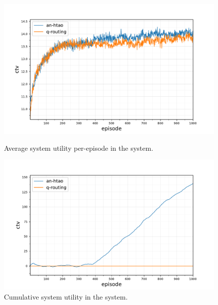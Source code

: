 \begin{figure}[ht]
	\begin{minipage}{.49\textwidth}
		\centering
		\includegraphics[width=1.0\linewidth,trim={25pt 0pt 50pt 0pt},clip]{520balanced_statistics-optimal-ctv}
		\captionsetup{labelfont=bf,singlelinecheck=on}
		\caption{Average system utility per-episode in the \simulationSimple{}{} system.}
		\label{fig:simple_ctv}
	\end{minipage}
	\begin{minipage}{.49\textwidth}
		\centering
		\includegraphics[width=1.0\linewidth,trim={25pt 0pt 50pt 0pt},clip]{520comparison_statistics-optimal-ctv-comparison-cumulative}
		\captionsetup{labelfont=bf,singlelinecheck=on}
		\caption{Cumulative system utility in the \simulationSimple{}{} system.}
		\label{fig:simple_cumulative_ctv}
	\end{minipage}\hfill%
\end{figure}

